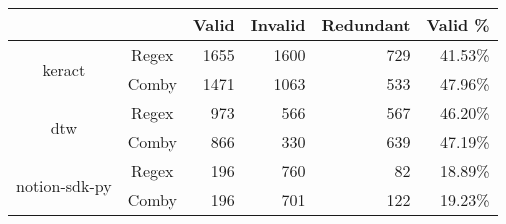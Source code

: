 \documentclass[sigconf,review, anonymous]{acmart}
\begin{document}
{\begin{table}[hbtp]
{\begin{tabular}{|c|c|c|r|r|r|r|}
\hline
 & \multicolumn{2}{c|}{} & \textbf{Valid} & \textbf{Invalid} & \textbf{Redundant} & \textbf{Valid \%}  \\ \hline
\multirow{2}{*}{keract} & \multicolumn{2}{c|}{Regex} & 1655 \hspace{8pt} & 1600 \hspace{8pt} &	729 \hspace{8pt} & 41.53\%  \\\cline{2-7}
    & \multicolumn{2}{c|}{Comby} & 1471 \hspace{8pt} & 1063 \hspace{8pt} & 533 \hspace{8pt} & 47.96\% \\ \hline
\multirow{2}{*}{dtw} & \multicolumn{2}{c|}{Regex} & 973 \hspace{8pt} & 566 \hspace{8pt} & 567 \hspace{8pt} & 46.20\% \\\cline{2-7}
    & \multicolumn{2}{c|}{Comby} & 866 \hspace{8pt} & 330 \hspace{8pt} & 639 \hspace{8pt} &	47.19\% \\ \hline
\multirow{2}{*}{notion-sdk-py} & \multicolumn{2}{c|}{Regex} & 196 \hspace{8pt} & 760 \hspace{8pt} & 82 \hspace{8pt} & 18.89\% \\\cline{2-7}
    & \multicolumn{2}{c|}{Comby} & 196 \hspace{8pt} & 701 \hspace{8pt} & 122 \hspace{8pt} & 19.23\% \\ \hline
    

\end{tabular}}
\end{table}}
\end{document}

